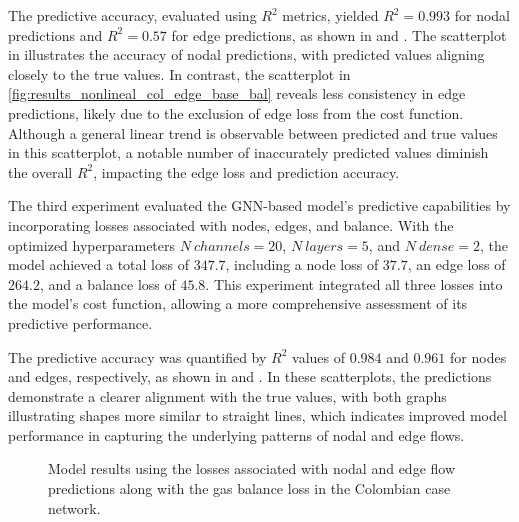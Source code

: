 The predictive accuracy, evaluated using \( R^2 \) metrics, yielded \( R^2 = 0.993 \) for nodal predictions and \( R^2 = 0.57 \) for edge predictions, as shown in  and . The scatterplot in  illustrates the accuracy of nodal predictions, with predicted values aligning closely to the true values. In contrast, the scatterplot in \cref{fig:results_nonlineal_col_edge_base_bal} reveals less consistency in edge predictions, likely due to the exclusion of edge loss from the cost function. Although a general linear trend is observable between predicted and true values in this scatterplot, a notable number of inaccurately predicted values diminish the overall \( R^2 \), impacting the edge loss and prediction accuracy.







The third experiment evaluated the GNN-based model's predictive capabilities by incorporating losses associated with nodes, edges, and balance. With the optimized hyperparameters \( N \ channels = 20 \), \( N \ layers = 5 \), and \( N \ dense = 2 \), the model achieved a total loss of \( 347.7 \), including a node loss of \( 37.7 \), an edge loss of \( 264.2 \), and a balance loss of \( 45.8 \). This experiment integrated all three losses into the model's cost function, allowing a more comprehensive assessment of its predictive performance.

The predictive accuracy was quantified by \( R^2 \) values of \( 0.984 \) and \( 0.961 \) for nodes and edges, respectively, as shown in  and . In these scatterplots, the predictions demonstrate a clearer alignment with the true values, with both graphs illustrating shapes more similar to straight lines, which indicates improved model performance in capturing the underlying patterns of nodal and edge flows.


\begin{figure}[htbp]
    \centering
    \setlength{}        
    \setlength{} 
    
    \caption{Model results using the losses associated with nodal and edge flow predictions along with the gas balance loss in the Colombian case network.}
    \label{fig:col_base_f_bal_results_non_lineal}
\end{figure}



